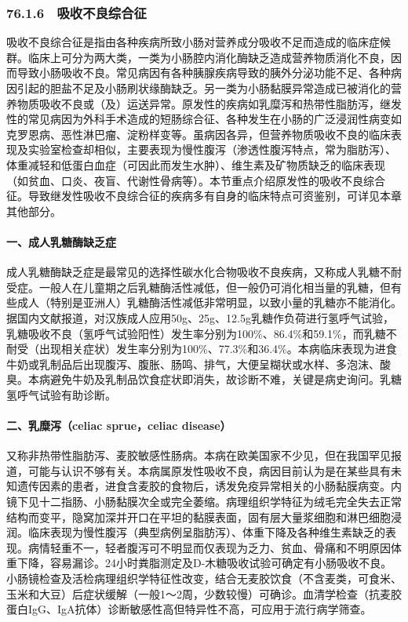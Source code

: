 \subsubsection{76.1.6　吸收不良综合征}

吸收不良综合征是指由各种疾病所致小肠对营养成分吸收不足而造成的临床症候群。临床上可分为两大类，一类为小肠腔内消化酶缺乏造成营养物质消化不良，因而导致小肠吸收不良。常见病因有各种胰腺疾病导致的胰外分泌功能不足、各种病因引起的胆盐不足及小肠刷状缘酶缺乏。另一类为小肠黏膜异常造成已被消化的营养物质吸收不良或（及）运送异常。原发性的疾病如乳糜泻和热带性脂肪泻，继发性的常见病因为外科手术造成的短肠综合征、各种发生在小肠的广泛浸润性病变如克罗恩病、恶性淋巴瘤、淀粉样变等。虽病因各异，但营养物质吸收不良的临床表现及实验室检查却相似，主要表现为慢性腹泻（渗透性腹泻特点，常为脂肪泻）、体重减轻和低蛋白血症（可因此而发生水肿）、维生素及矿物质缺乏的临床表现（如贫血、口炎、夜盲、代谢性骨病等）。本节重点介绍原发性的吸收不良综合征。导致继发性吸收不良综合征的疾病多有自身的临床特点可资鉴别，可详见本章其他部分。

\paragraph{一、成人乳糖酶缺乏症}

成人乳糖酶缺乏症是最常见的选择性碳水化合物吸收不良疾病，又称成人乳糖不耐受症。一般人在儿童期之后乳糖酶活性减低，但一般仍可消化相当量的乳糖，但有些成人（特别是亚洲人）乳糖酶活性减低非常明显，以致小量的乳糖亦不能消化。据国内文献报道，对汉族成人应用50g、25g、12.5g乳糖作负荷进行氢呼气试验，乳糖吸收不良（氢呼气试验阳性）发生率分别为100\%、86.4\%和59.1\%，而乳糖不耐受（出现相关症状）发生率分别为100\%、77.3\%和36.4\%。本病临床表现为进食牛奶或乳制品后出现腹泻、腹胀、肠鸣、排气，大便呈糊状或水样、多泡沫、酸臭。本病避免牛奶及乳制品饮食症状即消失，故诊断不难，关键是病史询问。乳糖氢呼气试验有助诊断。

\paragraph{二、乳糜泻（celiac sprue，celiac disease）}

又称非热带性脂肪泻、麦胶敏感性肠病。本病在欧美国家不少见，但在我国罕见报道，可能与认识不够有关。本病属原发性吸收不良，病因目前认为是在某些具有未知遗传因素的患者，进食含麦胶的食物后，诱发免疫异常相关的小肠黏膜病变。内镜下见十二指肠、小肠黏膜次全或完全萎缩。病理组织学特征为绒毛完全失去正常结构而变平，隐窝加深并开口在平坦的黏膜表面，固有层大量浆细胞和淋巴细胞浸润。临床表现为慢性腹泻（典型病例呈脂肪泻）、体重下降及各种维生素缺乏的表现。病情轻重不一，轻者腹泻可不明显而仅表现为乏力、贫血、骨痛和不明原因体重下降，容易漏诊。24小时粪脂测定及D-木糖吸收试验可确定有小肠吸收不良。小肠镜检查及活检病理组织学特征性改变，结合无麦胶饮食（不含麦类，可食米、玉米和大豆）后症状缓解（一般1～2周，少数较慢）可确诊。血清学检查（抗麦胶蛋白IgG、IgA抗体）诊断敏感性高但特异性不高，可应用于流行病学筛查。

